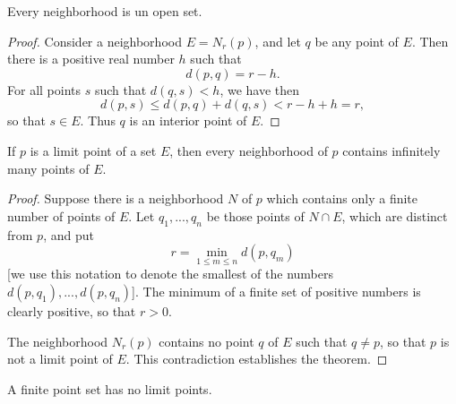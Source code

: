 \begin{thm}
    \label{thm:2.19}
    Every neighborhood is un open set.
\end{thm}
\begin{proof}
    Consider a neighborhood $E = N_r(p)$, 
    and let $q$ be any point of $E$.
    Then there is a positive real number $h$ such that
    \begin{equation*}
        d(p, q) = r - h.
    \end{equation*}
    For all points $s$ such that $d(q, s) < h$, we have then
    \begin{equation*}
        d(p, s) \leq d(p, q) + d(q, s) < r - h + h = r,
    \end{equation*}
    so that $s \in E$. 
    Thus $q$ is an interior point of $E$.
\end{proof}

\begin{thm}
    \label{thm:2.20}
    If $p$ is a limit point of a set $E$, then every neighborhood of $p$ contains infinitely many points of $E$.
\end{thm}

\begin{proof}
    Suppose there is a neighborhood $N$ of $p$ 
    which contains only a finite number of points of $E$. 
    Let $q_1, ... , q_n$ be those points of $N \cap E$,
    which are distinct from $p$, and put
    \begin{equation*}
        r = \min_{1 \leq m \leq n} d(p, q_m)
    \end{equation*}
    [we use this notation to denote the smallest of the numbers 
    $d(p, q_1), ..., d(p, q_n)$]. 
    The minimum of a finite set of positive numbers is clearly positive, 
    so that $r > 0$.

    The neighborhood $N_r(p)$ contains no point $q$ of $E$ such that $q \neq p$,
    so that $p$ is not a limit point of $E$. 
    This contradiction establishes the theorem.
\end{proof}

\begin{myCorollary*}
    A finite point set has no limit points.
\end{myCorollary*}

